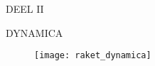 \null\thispagestyle{empty}

\vfill

\begin{center}
\textsc{DEEL II}
\end{center}
\begin{center}
\textsc{\LARGE DYNAMICA}
\end{center}

\vfill

\begin{figure}[h]
\centering
\texttt{[image: raket\_dynamica]}
\end{figure}


\vfill



